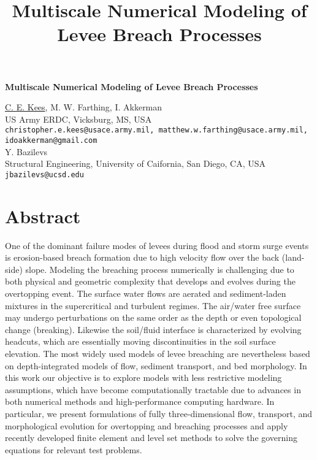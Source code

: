 \title{Multiscale Numerical Modeling of Levee Breach Processes}
\author{} \institute{}

\begin{center}

\textbf{\Large Multiscale Numerical Modeling of Levee Breach Processes}\\
\vspace{10mm}

{\large \underline{C. E. Kees}, M. W. Farthing, I. Akkerman}\\
US Army ERDC, Vicksburg, MS, USA\\
{\tt christopher.e.kees@usace.army.mil, matthew.w.farthing@usace.army.mil, idoakkerman@gmail.com}\\
\vspace{4mm}
{\large Y. Bazilevs}\\
Structural Engineering, University of Caifornia, San Diego, CA, USA\\
{\tt jbazilevs@ucsd.edu}

\end{center}

\section*{Abstract}

One of the dominant failure modes of levees during flood and storm surge events is erosion-based breach formation due to high velocity flow over the back (land-side) slope.  Modeling the breaching process numerically is challenging due to both physical and geometric complexity that develops and evolves during the overtopping event. The surface water flows are aerated and sediment-laden mixtures in the supercritical and turbulent regimes. The air/water free surface may undergo perturbations on the same order as the depth or even topological change (breaking). Likewise the soil/fluid interface is characterized by evolving headcuts, which are essentially moving discontinuities in the soil surface elevation. The most widely used models of levee breaching are nevertheless based on depth-integrated
models of flow, sediment transport, and bed morphology. In this work our objective is to explore models with less restrictive modeling assumptions, which have become computationally tractable due to advances in both numerical methods and high-performance computing hardware. In particular, we present formulations of fully three-dimensional flow, transport, and morphological evolution for overtopping and breaching processes and apply recently developed finite element and level set methods to solve the governing equations for relevant test problems.